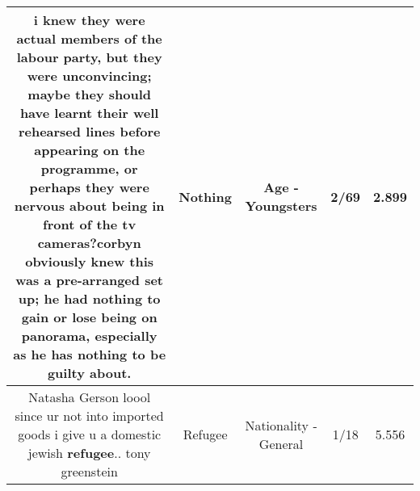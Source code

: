 \documentclass[11pt]{article}
\newlength\mylength
\begin{document}
\begin{center}
\begin{longtable}{|C{.65\mylength}|C{.30\mylength}|C{.12\mylength}|C{.12\mylength}|C{.12\mylength}|}
  \small i knew they were actual members of the labour party, but they were unconvincing; maybe they should have learnt their well rehearsed lines before appearing on the programme, or perhaps they were nervous about being in front of the tv cameras?corbyn obviously knew this was a pre-arranged set up; he had \textbf{nothing} to gain or lose being on panorama, especially as he has \textbf{nothing} to be guilty about.\normalsize   & Nothing & Age - Youngsters & 2/69 & 2.899 \\  \hline
  \small Natasha Gerson loool  since ur not into imported goods i give u a domestic jewish \textbf{refugee}.. tony greenstein\normalsize   & Refugee & Nationality - General & 1/18 & 5.556 \\  \hline
  
\end{longtable}
\end{center}
\end{document}
